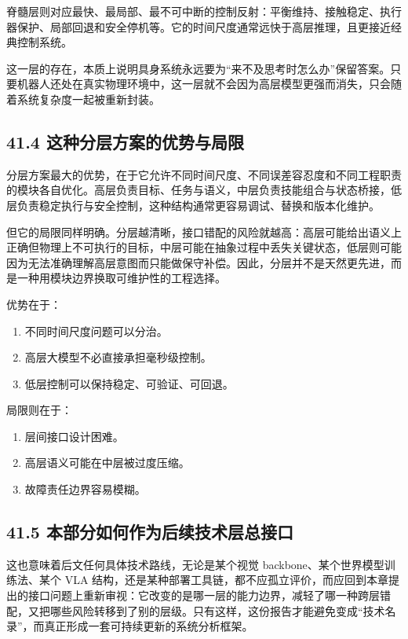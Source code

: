 脊髓层则对应最快、最局部、最不可中断的控制反射：平衡维持、接触稳定、执行器保护、局部回退和安全停机等。它的时间尺度通常远快于高层推理，且更接近经典控制系统。

这一层的存在，本质上说明具身系统永远要为“来不及思考时怎么办”保留答案。只要机器人还处在真实物理环境中，这一层就不会因为高层模型更强而消失，只会随着系统复杂度一起被重新封装。

\subsection*{41.4 这种分层方案的优势与局限}


分层方案最大的优势，在于它允许不同时间尺度、不同误差容忍度和不同工程职责的模块各自优化。高层负责目标、任务与语义，中层负责技能组合与状态桥接，低层负责稳定执行与安全控制，这种结构通常更容易调试、替换和版本化维护。

但它的局限同样明确。分层越清晰，接口错配的风险就越高：高层可能给出语义上正确但物理上不可执行的目标，中层可能在抽象过程中丢失关键状态，低层则可能因为无法准确理解高层意图而只能做保守补偿。因此，分层并不是天然更先进，而是一种用模块边界换取可维护性的工程选择。

优势在于：

\begin{enumerate}
\item 不同时间尺度问题可以分治。
\item 高层大模型不必直接承担毫秒级控制。
\item 低层控制可以保持稳定、可验证、可回退。
\end{enumerate}

局限则在于：

\begin{enumerate}
\item 层间接口设计困难。
\item 高层语义可能在中层被过度压缩。
\item 故障责任边界容易模糊。
\end{enumerate}

\subsection*{41.5 本部分如何作为后续技术层总接口}


这也意味着后文任何具体技术路线，无论是某个视觉 backbone、某个世界模型训练法、某个 VLA 结构，还是某种部署工具链，都不应孤立评价，而应回到本章提出的接口问题上重新审视：它改变的是哪一层的能力边界，减轻了哪一种跨层错配，又把哪些风险转移到了别的层级。只有这样，这份报告才能避免变成“技术名录”，而真正形成一套可持续更新的系统分析框架。

